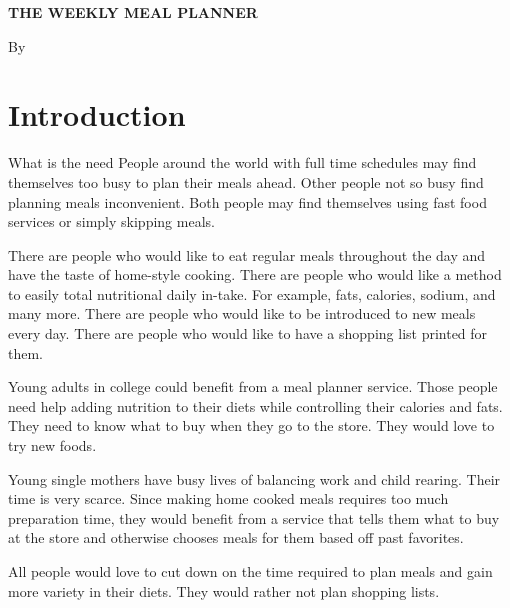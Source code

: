 \documentclass[a4paper,10pt,toc=graduated]{article}
\author{\docauthor}
\title{\doctitle}
\newcommand*\docauthor{
Josh Gillham
\\
Randy Mangel
\\
Sann Voun
\\
Daniel Eason
\\
}
\newcommand*\doctitle{The Weekly Meal Planner}
\begin{document}
\vspace*{\fill}

\begin{center}
\begin{em}
\bf
\huge
\noindent
\uppercase{
\doctitle
}
\end{em}
\end{center}
\vspace{\fill}

\begin{center}
\tiny
By

\begin{em}
\small
\noindent
\uppercase{
\docauthor
}
\end{em}
\end{center}
\vspace{\fill}
\newpage
\setcounter{tocdepth}{2}
\tableofcontents
\newpage
\section{Introduction}
\begin{mySubsection}{What is the need}
People around the world with full time schedules may find themselves too busy
to plan their meals ahead.
Other people not so busy find planning meals inconvenient.
Both people may find themselves using fast food services
or simply skipping meals.

There are people who would like to eat regular meals throughout the day
and have the taste of home-style cooking.
There are people who would like a method to easily total nutritional daily in-take.
For example, fats, calories, sodium, and many more.
There are people who would like to be introduced to new meals every day.
There are people who would like to have a shopping list printed for them.

Young adults in college could benefit from a meal planner service.
Those people need help adding nutrition to their diets
while controlling their calories and fats.
They need to know what to buy when they go to the store.
They would love to try new foods.

Young single mothers have busy lives of balancing work and child rearing.
Their time is very scarce.
Since making home cooked meals requires too much preparation time,
they would benefit from a service
that tells them what to buy at the store
and otherwise chooses meals for them based off past favorites.

All people would love to cut down on the time required to plan meals
and gain more variety in their diets.
They would rather not plan shopping lists.
\end{mySubsection}
\end{document}
